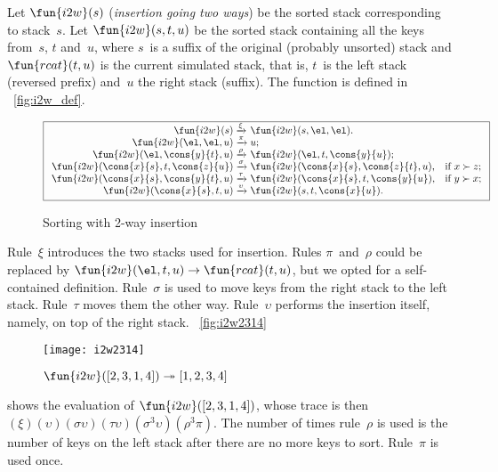 Let \(\fun{i2w}(s)\) (\emph{insertion going two
  ways}) be the sorted stack corresponding to stack~\(s\). Let
\(\fun{i2w}(s,t,u)\) be the sorted stack
containing all the keys from~\(s\), \(t\) and~\(u\), where \(s\)~is a
suffix of the original (probably unsorted) stack and
\(\fun{rcat}(t,u)\) is the current simulated
stack, that is, \(t\)~is the left stack (reversed prefix) and~\(u\)
the right stack (suffix). The function
 is defined in
\fig~\vref{fig:i2w_def}.
\begin{figure}
\begin{equation*}
\boxed{%
\begin{array}{r@{\;}l@{\;}ll}
\fun{i2w}(s)         & \xrightarrow{\smash{\xi}}
                     & \fun{i2w}(s,\el,\el).\\
\fun{i2w}(\el,\el,u) & \xrightarrow{\smash{\pi}}
                     & u;\\
\fun{i2w}(\el,\cons{y}{t},u)
                     & \xrightarrow{\smash{\rho}}
                     & \fun{i2w}(\el,t,\cons{y}{u});\\
\fun{i2w}(\cons{x}{s},t,\cons{z}{u})
                     & \xrightarrow{\smash{\sigma}}
                     & \fun{i2w}(\cons{x}{s},\cons{z}{t},u),
                     & \text{if \(x \succ z\)};\\
\fun{i2w}(\cons{x}{s},\cons{y}{t},u)
                     & \xrightarrow{\smash{\tau}}
                     & \fun{i2w}(\cons{x}{s},t,\cons{y}{u}),
                     & \text{if \(y \succ x\)};\\
\fun{i2w}(\cons{x}{s},t,u)
                     & \xrightarrow{\smash{\upsilon}}
                     & \fun{i2w}(s,t,\cons{x}{u}).
\end{array}}
\end{equation*}
\caption{Sorting with 2-way insertion }
\label{fig:i2w_def}
\end{figure}
Rule~\(\xi\) introduces the two stacks used for insertion. Rules
\(\pi\)~and~\(\rho\) could be replaced by \(\fun{i2w}(\el,t,u)
\rightarrow \fun{rcat}(t,u)\), but we opted for a self\hyp{}contained
definition. Rule~\(\sigma\) is used to move keys from the right stack
to the left stack. Rule~\(\tau\) moves them the other
way. Rule~\(\upsilon\) performs the insertion itself, namely, on top
of the right stack. \Fig~\vref{fig:i2w2314}
\begin{figure}[t]
\centering
\texttt{[image: i2w2314]}
\caption{\(\fun{i2w}([2,3,1,4]) \twoheadrightarrow [1,2,3,4]\)}
\label{fig:i2w2314}
\end{figure}
shows the evaluation of
\(\fun{i2w}([2,3,1,4])\), whose trace  is then \((\xi)(\upsilon)(\sigma\upsilon)
(\tau\upsilon)(\sigma^3\upsilon)(\rho^3\pi)\). The number of times
rule~\(\rho\) is used is the number of keys on the left
stack after there are no more keys to sort. Rule~\(\pi\) is used once.

